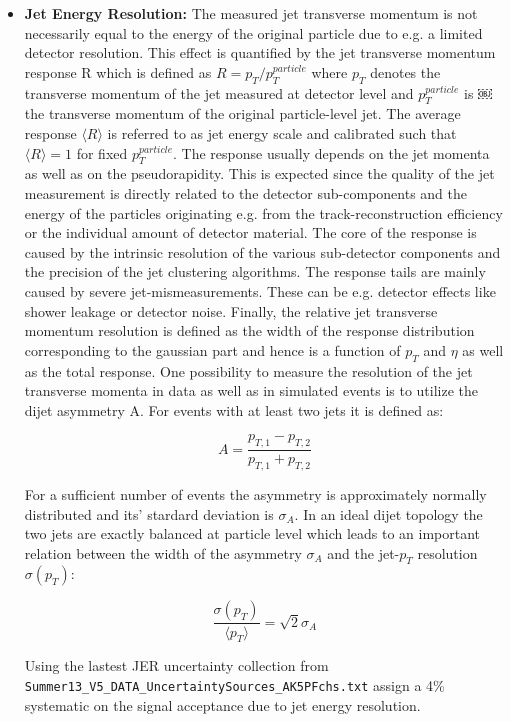 \begin{itemize}
  \item \textbf{Jet Energy Resolution:}  The measured jet transverse momentum is not necessarily equal to the energy of the original particle due to e.g. a limited detector resolution. This effect is quantified by the jet transverse momentum response R which is defined as $R = p_{T} / p_{T}^{particle}$  where $p_{T}$ denotes the transverse momentum of the jet measured at detector level and $p_{T}^{particle}$ is ￼the transverse momentum of the original particle-level jet. The average response $\langle R \rangle$ is referred to as jet energy scale and calibrated such that $\langle R \rangle = 1$ for fixed $p_{T}^{particle}$. The response usually depends on the jet momenta as well as on the pseudorapidity. This is expected since the quality of the jet measurement is directly related to the detector sub-components and the energy of the particles originating e.g. from the track-reconstruction efficiency or the individual amount of detector material. The core of the response is caused by the intrinsic resolution of the various sub-detector components and the precision of the jet clustering algorithms. The response tails are mainly caused by severe jet-mismeasurements. These can be e.g. detector effects like shower leakage or detector noise. Finally, the relative jet transverse momentum resolution is defined as the width of the response distribution corresponding to the gaussian part and hence is a function of $p_{T}$ and $\eta$ as well as the total response. One possibility to measure the resolution of the jet transverse momenta in data as well as in simulated events is to utilize the dijet asymmetry A. For events with at least two jets it is defined as:
  
  \begin{equation}
  A = \frac{p_{T,1} - p_{T,2}}{p_{T,1} + p_{T,2}}
  \end{equation}
  
  For a sufficient number of events the asymmetry is approximately normally distributed and its' stardard deviation is $\sigma_{A}$. In an ideal dijet topology the two jets are exactly balanced at particle level which leads to an important relation between the width of the asymmetry $\sigma_{A}$ and the jet-$p_{T}$ resolution $\sigma(p_{T})$:
  
  \begin{equation}
  \frac{\sigma(p_{T})}{\langle p_{T} \rangle} = \sqrt{2} \sigma_{A}
  \end{equation}
  
  Using the lastest JER uncertainty collection from \texttt{Summer13\_\-V5\_DATA\_\-Uncertainty\-Sources\_\-AK5PFchs.txt} assign a 4\% systematic on the signal acceptance due to jet energy resolution. 


\end{itemize}
